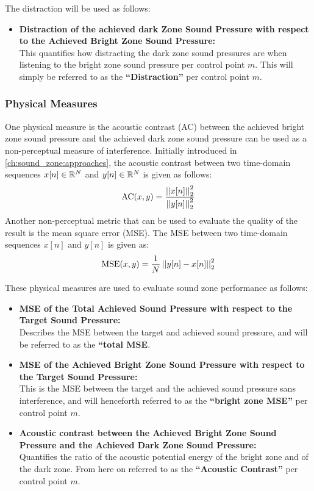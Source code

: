 The distraction will be used as follows:
\begin{itemize}
    \item \textbf{Distraction of the achieved dark Zone Sound Pressure with respect to the Achieved Bright 
        Zone Sound Pressure:}\\
        This quantifies how distracting the dark zone sound pressures are when listening to the bright zone 
        sound pressure per control point $m$. 
        This will simply be referred to as the \textbf{``Distraction''} per control point $m$.
\end{itemize}

\subsubsection{Physical Measures}
One physical measure is the acoustic contrast (AC) between the 
achieved bright zone sound pressure and the achieved dark zone sound pressure can be used as a non-perceptual measure of interference.
Initially introduced in \autoref{ch:sound_zone:approaches}, 
the acoustic contrast between two time-domain sequences $x[n]\in\mathbb{R}^{N}$
and $y[n]\in\mathbb{R}^{N}$ is given as follows: 
\begin{equation}
    \mathrm{AC}(x,y) = \frac{\norm[2][2]{x[n]}}{\norm[2][2]{y[n]}} 
\end{equation}
Another non-perceptual metric that can be used to evaluate the quality of the result is the mean square error (MSE).
The MSE between two time-domain sequences $x[n]$ and $y[n]$ is given as:
\begin{equation}
    \text{MSE}(x,y) = \frac{1}{N}\norm[2][2]{y[n] - x[n]} 
\end{equation}

These physical measures are used to evaluate sound zone performance as follows:
\begin{itemize}
    \item \textbf{MSE of the Total Achieved Sound Pressure with respect to the Target Sound Pressure:}\\
        Describes the MSE between the target and achieved sound pressure, and will be referred to as the 
        \textbf{``total MSE}.
    \item \textbf{MSE of the Achieved Bright Zone Sound Pressure with respect to the Target Sound Pressure:}\\
        This is the MSE between the target and the achieved sound pressure sans interference, 
        and will henceforth referred to as the \textbf{``bright zone MSE''} per control point $m$.
    \item \textbf{Acoustic contrast between the Achieved Bright Zone Sound Pressure and the 
        Achieved Dark Zone Sound Pressure:}\\
        Quantifies the ratio of the acoustic potential energy of the bright zone and of the dark zone.
        From here on referred to as the \textbf{``Acoustic Contrast''} per control point $m$.
\end{itemize}
